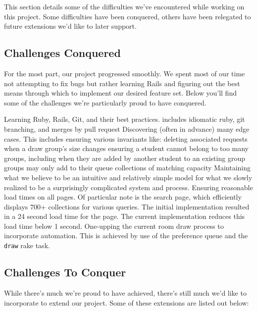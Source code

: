 This section details some of the difficulties we've encountered while working on
this project. Some difficulties have been conquered, others have been relegated
to future extensions we'd like to later support.

\subsection{Challenges Conquered}

For the most part, our project progressed smoothly. We spent most of our time
not attempting to fix bugs but rather learning Rails and figuring out the best
means through which to implement our desired feature set. Below you'll find some
of the challenges we're particularly proud to have conquered.

\begin{outline}
\1 Learning Ruby, Rails, Git, and their best practices.
  \2 includes idiomatic ruby, git branching, and merges by pull request
\1 Discovering (often in advance) many edge cases. This includes ensuring
  various invariants like:
  \2 deleting associated requests when a draw group's size changes
  \2 ensuring a student cannot belong to too many groups, including when they
  are added by another student to an existing group
  \2 groups may only add to their queue collections of matching capacity
\1 Maintaining what we believe to be an intuitive and relatively simple model
  for what we slowly realized to be a surprisingly complicated system and
  process.
\1 Ensuring reasonable load times on all pages.
  \2 Of particular note is the search page, which efficiently displays 700+
  collections for various queries. The initial implementation resulted in a 24
  second load time for the page. The current implementation reduces this load
  time below 1 second.
\1 One-upping the current room draw process to incorporate automation.
  \2 This is achieved by use of the preference queue and the \texttt{draw} rake
  task.
\end{outline}

\subsection{Challenges To Conquer}

While there's much we're proud to have achieved, there's still much we'd like to
incorporate to extend our project. Some of these extensions are listed out
below:

